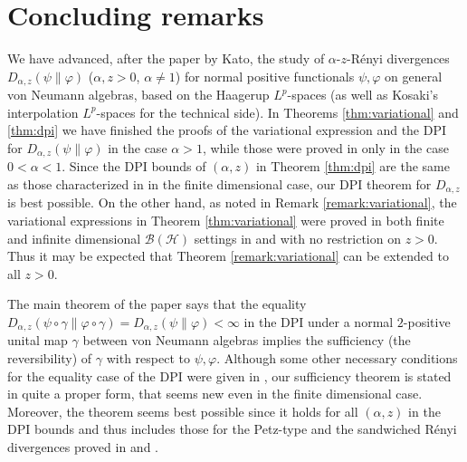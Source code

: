 \documentclass[12pt]{article}
\theoremstyle{definition}
\theoremstyle{remark}
\numberwithin{equation}{section}
\def\ffi{\varphi}
\begin{document}
\section{Concluding remarks}

We have advanced, after the paper \cite{kato2023onrenyi} by Kato, the study of $\alpha$-$z$-R\'enyi
divergences $D_{\alpha,z}(\psi\|\ffi)$ ($\alpha,z>0$, $\alpha\ne1$) for normal positive functionals $\psi,\ffi$
on general von Neumann algebras, based on the Haagerup $L^p$-spaces (as well as Kosaki's
interpolation $L^p$-spaces for the technical side). In Theorems \ref{thm:variational} and \ref{thm:dpi}
we have finished the proofs of the variational expression and the DPI for $D_{\alpha,z}(\psi\|\ffi)$ in the case
$\alpha>1$, while those were proved in \cite{kato2023onrenyi} only in the case $0<\alpha<1$. Since the
DPI bounds of $(\alpha,z)$ in Theorem \ref{thm:dpi} are the same as those characterized in
\cite{zhang2020fromwyd} in the finite dimensional case, our DPI theorem for $D_{\alpha,z}$ is best possible.
On the other hand, as noted in Remark \ref{remark:variational}, the variational expressions in Theorem
\ref{thm:variational} were proved in both finite and infinite dimensional $\mathcal{B}(\mathcal{H})$ settings
in \cite{zhang2020fromwyd} and \cite{mosonyi2023thestrong} with no restriction on $z>0$. Thus it may
be expected that Theorem \ref{remark:variational} can be extended to all $z>0$.

The main theorem of the paper says that the equality
$D_{\alpha,z}(\psi\circ\gamma\|\ffi\circ\gamma)=D_{\alpha,z}(\psi\|\ffi)<\infty$ in the DPI under a normal
$2$-positive unital map $\gamma$ between von Neumann algebras implies the sufficiency (the reversibility)
of $\gamma$ with respect to $\psi,\ffi$. Although some other necessary conditions for the equality case of
the DPI were given in \cite{zhang2020equality}, our sufficiency theorem is stated in quite a proper form,
that seems new even in the finite dimensional case. Moreover, the theorem seems best possible since it
holds for all $(\alpha,z)$ in the DPI bounds and thus includes those for the Petz-type and the sandwiched
R\'enyi divergences proved in \cite[Theorem 6.19]{hiai2021quantum} and
\cite{jencova2018renyi,jencova2021renyi}.
\end{document}
